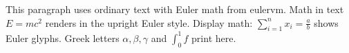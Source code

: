 \documentclass{article}
\begin{document}
This paragraph uses ordinary text with Euler math from eulervm.
Math in text $E = mc^2$ renders in the upright Euler style.
Display math: $\sum_{i=1}^{n} x_i = \frac{a}{b}$ shows Euler glyphs.
Greek letters $\alpha, \beta, \gamma$ and $\int_0^1 f$ print here.
\end{document}
